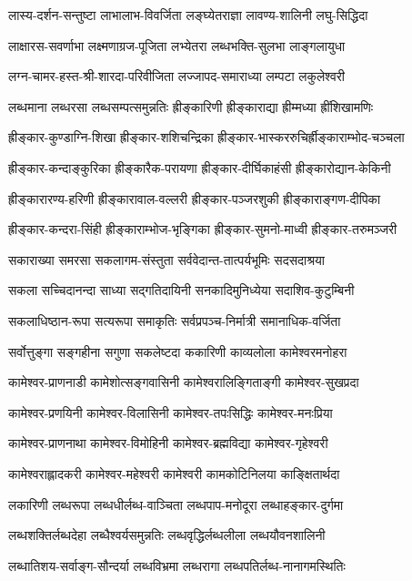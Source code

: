 \twolineshloka
{लास्य-दर्शन-सन्तुष्टा लाभालाभ-विवर्जिता}
{लङ्घ्येतराज्ञा लावण्य-शालिनी लघु-सिद्धिदा}

\twolineshloka
{लाक्षारस-सवर्णाभा लक्ष्मणाग्रज-पूजिता}
{लभ्येतरा लब्धभक्ति-सुलभा लाङ्गलायुधा}

\twolineshloka
{लग्न-चामर-हस्त-श्री-शारदा-परिवीजिता}
{लज्जापद-समाराध्या लम्पटा लकुलेश्वरी}

\twolineshloka
{लब्धमाना लब्धरसा लब्धसम्पत्समुन्नतिः}
{ह्रीङ्कारिणी  ह्रीङ्काराद्या ह्रीम्मध्या ह्रींशिखामणिः}

\twolineshloka
{ह्रीङ्कार-कुण्डाग्नि-शिखा ह्रीङ्कार-शशिचन्द्रिका}
{ह्रीङ्कार-भास्कररुचिर्ह्रीङ्काराम्भोद-चञ्चला}

\twolineshloka
{ह्रीङ्कार-कन्दाङ्कुरिका ह्रीङ्कारैक-परायणा}
{ह्रीङ्कार-दीर्घिकाहंसी ह्रीङ्कारोद्यान-केकिनी}

\twolineshloka
{ह्रीङ्कारारण्य-हरिणी ह्रीङ्कारावाल-वल्लरी}
{ह्रीङ्कार-पञ्जरशुकी ह्रीङ्काराङ्गण-दीपिका}

\twolineshloka
{ह्रीङ्कार-कन्दरा-सिंही ह्रीङ्काराम्भोज-भृङ्गिका}
{ह्रीङ्कार-सुमनो-माध्वी ह्रीङ्कार-तरुमञ्जरी}

\twolineshloka
{सकाराख्या समरसा सकलागम-संस्तुता}
{सर्ववेदान्त-तात्पर्यभूमिः सदसदाश्रया}

\twolineshloka
{सकला सच्चिदानन्दा साध्या सद्गतिदायिनी}
{सनकादिमुनिध्येया सदाशिव-कुटुम्बिनी}

\twolineshloka
{सकलाधिष्ठान-रूपा सत्यरूपा समाकृतिः}
{सर्वप्रपञ्च-निर्मात्री समानाधिक-वर्जिता}

\twolineshloka
{सर्वोत्तुङ्गा सङ्गहीना सगुणा सकलेष्टदा}
{ककारिणी काव्यलोला कामेश्वरमनोहरा}

\twolineshloka
{कामेश्वर-प्राणनाडी कामेशोत्सङ्गवासिनी}
{कामेश्वरालिङ्गिताङ्गी कामेश्वर-सुखप्रदा}

\twolineshloka
{कामेश्वर-प्रणयिनी कामेश्वर-विलासिनी}
{कामेश्वर-तपःसिद्धिः कामेश्वर-मनःप्रिया}

\twolineshloka
{कामेश्वर-प्राणनाथा कामेश्वर-विमोहिनी}
{कामेश्वर-ब्रह्मविद्या कामेश्वर-गृहेश्वरी}

\twolineshloka
{कामेश्वराह्लादकरी कामेश्वर-महेश्वरी}
{कामेश्वरी कामकोटिनिलया काङ्क्षितार्थदा}

\twolineshloka
{लकारिणी लब्धरूपा लब्धधीर्लब्ध-वाञ्चिता}
{लब्धपाप-मनोदूरा लब्धाहङ्कार-दुर्गमा}

\twolineshloka
{लब्धशक्तिर्लब्धदेहा लब्धैश्वर्यसमुन्नतिः}
{लब्धवृद्धिर्लब्धलीला लब्धयौवनशालिनी}

\twolineshloka
{लब्धातिशय-सर्वाङ्ग-सौन्दर्या लब्धविभ्रमा}
{लब्धरागा लब्धपतिर्लब्ध-नानागमस्थितिः}

